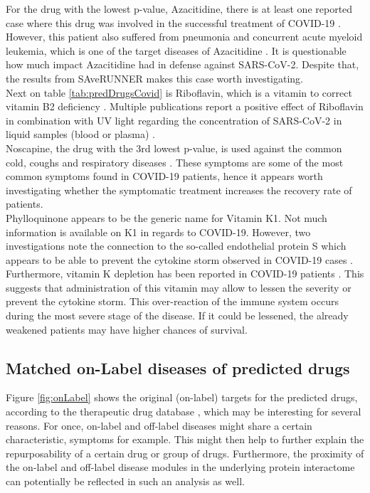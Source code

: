 For the drug with the lowest p-value, Azacitidine, there is at least one reported case where this drug was involved in the successful treatment of COVID-19 \cite{Taurino_2021}. However, this patient also suffered from pneumonia and concurrent acute myeloid leukemia, which is one of the target diseases of Azacitidine \cite{Wishart2017}. It is questionable how much impact Azacitidine had in defense against SARS-CoV-2. Despite that, the results from SAveRUNNER makes this case worth investigating.\\
Next on table \ref{tab:predDrugsCovid} is Riboflavin, which is a vitamin to correct vitamin B2 deficiency \cite{Wishart2017}. Multiple publications report a positive effect of Riboflavin in combination with UV light regarding the concentration of SARS-CoV-2 in liquid samples (blood or plasma) \cite{Ragan_2020, Yonemura_2021}. \\
Noscapine, the drug with the 3rd lowest p-value, is used against the common cold, coughs and respiratory diseases \cite{Wishart2017}. These symptoms are some of the most common symptoms found in COVID-19 patients, hence it appears worth investigating whether the symptomatic treatment increases the recovery rate of patients. \\
Phylloquinone appears to be the generic name for Vitamin K1. Not much information is available on K1 in regards to COVID-19. However, two investigations note the connection to the so-called endothelial protein S which appears to be able to prevent the cytokine storm observed in COVID-19 cases \cite{Popa_2021, Dofferhoff_2020}. Furthermore, vitamin K depletion has been reported in COVID-19 patients \cite{Dofferhoff_2020}. This suggests that administration of this vitamin may allow to lessen the severity or prevent the cytokine storm. This over-reaction of the immune system occurs during the most severe stage of the disease. If it could be lessened, the already weakened patients may have higher chances of survival.



\subsection{Matched on-Label diseases of predicted drugs}

Figure \ref{fig:onLabel} shows the original (on-label) targets for the predicted drugs, according to the therapeutic drug database \cite{Zhou_2022}, which may be interesting for several reasons. For once, on-label and off-label diseases might share a certain characteristic, symptoms for example. This might then help to further explain the repurposability of a certain drug or group of drugs.
Furthermore, the proximity of the on-label and off-label disease modules in the underlying protein interactome can potentially be reflected in such an analysis as well.

